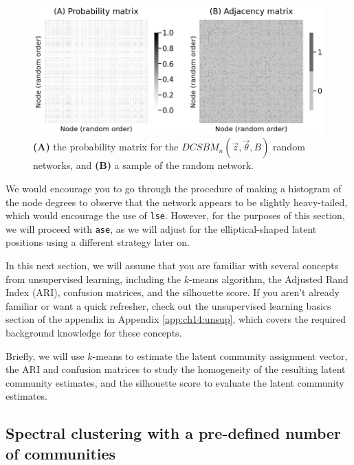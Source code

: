 \begin{figure}[h]
    \centering
    \includegraphics[width=\linewidth]{applications/ch7/Images/comm_detect_ex.png}
    \caption[Community detection three community example]{\textbf{(A)} the probability matrix for the $DCSBM_n(\vec z, \vec \theta, B)$ random networks, and \textbf{(B)} a sample of the random network.}
    \label{fig:ch7:comm_detect:ex}
\end{figure}
We would encourage you to go through the procedure of making a histogram of the node degrees to observe that the network appears to be slightly heavy-tailed, which would encourage the use of \texttt{lse}. However, for the purposes of this section, we will proceed with \texttt{ase}, as we will adjust for the elliptical-shaped latent positions using a different strategy later on. 

\begin{floatingbox}[h]\caption{Refamiliarize yourself with unsupervised learning}
In this next section, we will assume that you are familiar with several concepts from unsupervised learning, including the $k$-means algorithm, the Adjusted Rand Index (ARI), confusion matrices, and the silhouette score. If you aren't already familiar or want a quick refresher, check out the unsupervised learning basics section of the appendix in Appendix \ref{app:ch14:unsup}, which covers the required background knowledge for these concepts.

Briefly, we will use $k$-means to estimate the latent community assignment vector, the ARI and confusion matrices to study the homogeneity of the resulting latent community estimates, and the silhouette score to evaluate the latent community estimates.
\end{floatingbox}

\subsection{Spectral clustering with a pre-defined number of communities}
\label{sec:ch7:comm_detect:known}


